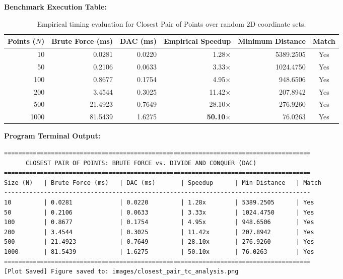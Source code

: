 \documentclass[12pt]{article}
\begin{document}
\textbf{Benchmark Execution Table:}

\begin{table}[H]
\centering
\begin{tabular}{|r|r|r|r|r|c|}
\hline
\textbf{Points ($N$)} & \textbf{Brute Force (ms)} & \textbf{DAC (ms)} & \textbf{Empirical Speedup} & \textbf{Minimum Distance} & \textbf{Match} \\
\hline
10   & 0.0281 & 0.0220 & 1.28$\times$  & 5389.2505 & Yes \\
50   & 0.2106 & 0.0633 & 3.33$\times$  & 1024.4750 & Yes \\
100  & 0.8677 & 0.1754 & 4.95$\times$  & 948.6506  & Yes \\
200  & 3.4544 & 0.3025 & 11.42$\times$ & 207.8942  & Yes \\
500  & 21.4923 & 0.7649 & 28.10$\times$ & 276.9260  & Yes \\
1000 & 81.5439 & 1.6275 & \textbf{50.10$\times$} & 76.0263 & Yes \\
\hline
\end{tabular}
\caption{Empirical timing evaluation for Closest Pair of Points over random 2D coordinate sets.}
\end{table}

\textbf{Program Terminal Output:}
\begin{lstlisting}
=====================================================================================
      CLOSEST PAIR OF POINTS: BRUTE FORCE vs. DIVIDE AND CONQUER (DAC)
=====================================================================================
Size (N)   | Brute Force (ms)   | DAC (ms)       | Speedup      | Min Distance   | Match
-------------------------------------------------------------------------------------
10         | 0.0281             | 0.0220         | 1.28x        | 5389.2505      | Yes
50         | 0.2106             | 0.0633         | 3.33x        | 1024.4750      | Yes
100        | 0.8677             | 0.1754         | 4.95x        | 948.6506       | Yes
200        | 3.4544             | 0.3025         | 11.42x       | 207.8942       | Yes
500        | 21.4923            | 0.7649         | 28.10x       | 276.9260       | Yes
1000       | 81.5439            | 1.6275         | 50.10x       | 76.0263        | Yes
=====================================================================================
[Plot Saved] Figure saved to: images/closest_pair_tc_analysis.png
\end{lstlisting}
\end{document}
